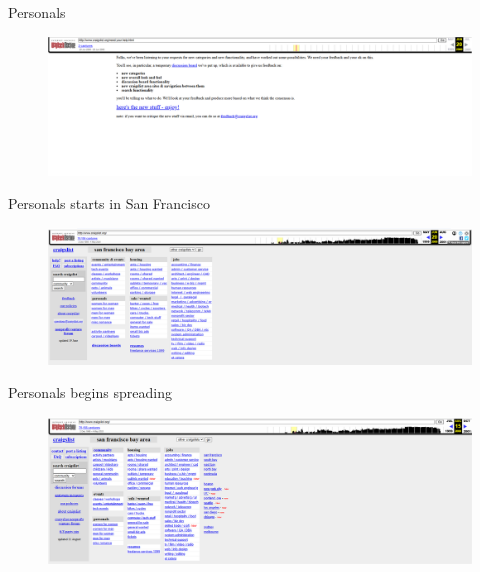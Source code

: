 \documentclass{beamer}
\begin{document}
\begin{frame}{Personals}
\begin{figure}
    \centering
    \includegraphics[height=0.5\textheight]{./lecture_includes/melanie2}
\end{figure}

\end{frame}

\begin{frame}{Personals starts in San Francisco}
\begin{figure}
    \centering
    \includegraphics[height=0.85\textheight]{./lecture_includes/melanie3}
\end{figure}

\end{frame}

\begin{frame}{Personals begins spreading}
\begin{figure}
    \centering
    \includegraphics[height=0.85\textheight]{./lecture_includes/melanie4}
\end{figure}

\end{frame}
\end{document}
